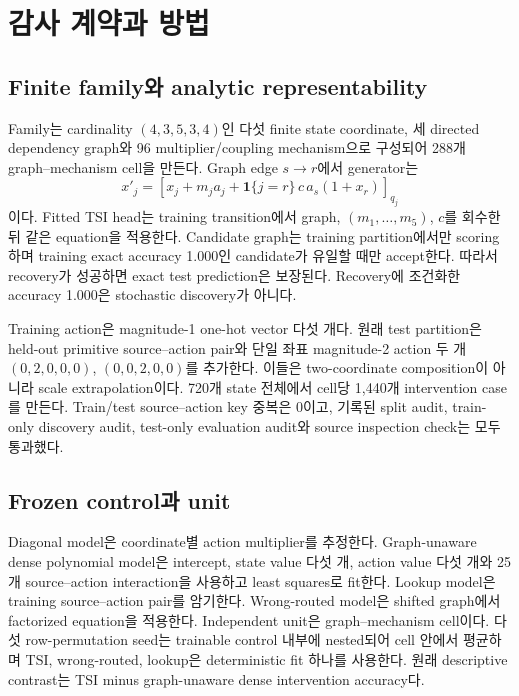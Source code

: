 \section{감사 계약과 방법}

\subsection{Finite family와 analytic representability}

Family는 cardinality \((4,3,5,3,4)\)인 다섯 finite state coordinate, 세 directed
dependency graph와 96 multiplier/coupling mechanism으로 구성되어 288개
graph--mechanism cell을 만든다. Graph edge \(s\to r\)에서 generator는
\[
x'_j=\left[x_j+m_j a_j+
\mathbf 1\{j=r\}\,c\,a_s(1+x_r)\right]_{q_j}
\]
이다. Fitted TSI head는 training transition에서 graph,
\((m_1,\ldots,m_5)\), \(c\)를 회수한 뒤 같은 equation을 적용한다. Candidate
graph는 training partition에서만 scoring하며 training exact accuracy 1.000인
candidate가 유일할 때만 accept한다. 따라서 recovery가 성공하면 exact test
prediction은 보장된다. Recovery에 조건화한 accuracy 1.000은 stochastic
discovery가 아니다.

Training action은 magnitude-1 one-hot vector 다섯 개다. 원래 test partition은
held-out primitive source--action pair와 단일 좌표 magnitude-2 action 두 개
\((0,2,0,0,0)\), \((0,0,2,0,0)\)를 추가한다. 이들은 two-coordinate
composition이 아니라 scale extrapolation이다. 720개 state 전체에서 cell당
1,440개 intervention case를 만든다. Train/test source--action key 중복은 0이고,
기록된 split audit, train-only discovery audit, test-only evaluation audit와 source
inspection check는 모두 통과했다.

\subsection{Frozen control과 unit}

Diagonal model은 coordinate별 action multiplier를 추정한다. Graph-unaware dense
polynomial model은 intercept, state value 다섯 개, action value 다섯 개와 25개
source--action interaction을 사용하고 least squares로 fit한다. Lookup model은
training source--action pair를 암기한다. Wrong-routed model은 shifted graph에서
factorized equation을 적용한다. Independent unit은 graph--mechanism cell이다.
다섯 row-permutation seed는 trainable control 내부에 nested되어 cell 안에서
평균하며 TSI, wrong-routed, lookup은 deterministic fit 하나를 사용한다. 원래
descriptive contrast는 TSI minus graph-unaware dense intervention accuracy다.

